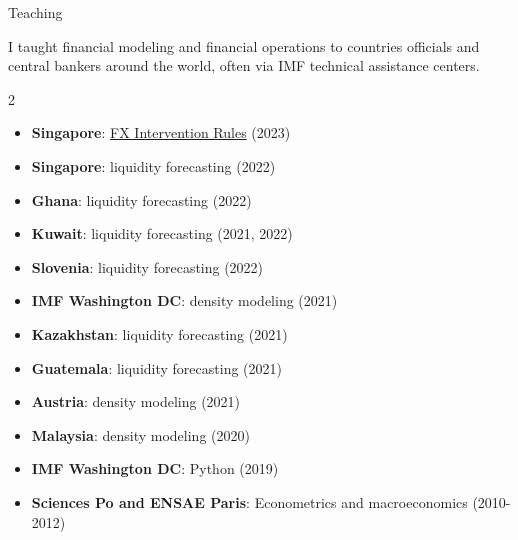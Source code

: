 \documentclass[usegeometry, 10pt, a4paper]{cv} %
\begin{document}
\begin{rubriquetableau}[0.95\textwidth]{Teaching}

  I taught financial modeling and financial operations to countries officials and central bankers around the world, often via IMF technical assistance centers. \\
  
  \begin{multicols}{2}
  
  \begin{itemize}
  \item \textbf{Singapore}: \href{https://romainlafarguette.github.io/fxinterventions/docs/index.html}{FX Intervention Rules} (2023)    
  \item \textbf{Singapore}: liquidity forecasting (2022)
  \item \textbf{Ghana}: liquidity forecasting (2022)
  \item \textbf{Kuwait}: liquidity forecasting (2021, 2022)
  \item \textbf{Slovenia}: liquidity forecasting (2022)
  \item \textbf{IMF Washington DC}: density modeling (2021)
  \item \textbf{Kazakhstan}: liquidity forecasting (2021)
  \item \textbf{Guatemala}: liquidity forecasting (2021)
  \item \textbf{Austria}: density modeling (2021)
  \item \textbf{Malaysia}: density modeling (2020)
  \item \textbf{IMF Washington DC}: Python (2019)
  \item \textbf{Sciences Po and ENSAE Paris}: Econometrics and macroeconomics (2010-2012)
  \end{itemize}
  
  \end{multicols}
\end{rubriquetableau}


\end{document}
